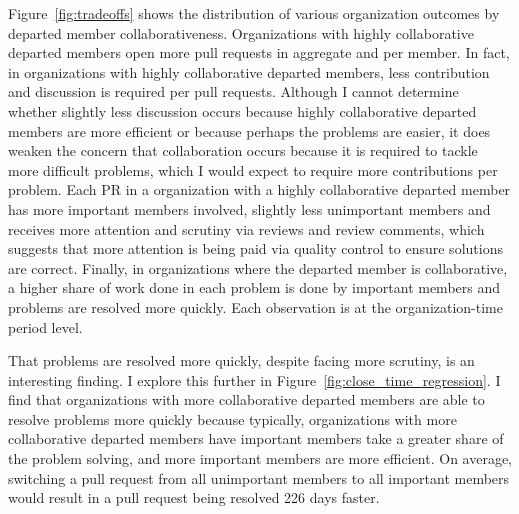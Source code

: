 \documentclass[12pt,notitlepage]{article}
\begin{document}
Figure~\ref{fig:tradeoffs} shows the distribution of various organization outcomes by departed member collaborativeness. Organizations with highly collaborative departed members open more pull requests in aggregate and per member. In fact, in organizations with highly collaborative departed members, less contribution and discussion is required per pull requests. Although I cannot determine whether slightly less discussion occurs because highly collaborative departed members are more efficient or because perhaps the problems are easier, it does weaken the concern that collaboration occurs because it is required to tackle more difficult problems, which I would expect to require more contributions per problem. Each PR in a organization with a highly collaborative departed member has more important members involved, slightly less unimportant members and receives more attention and scrutiny via reviews and review comments, which suggests that more attention is being paid via quality control to ensure solutions are correct. Finally, in organizations where the departed member is collaborative, a higher share of work done in each problem is done by important members and problems are resolved more quickly. Each observation is at the organization-time period level. 

That problems are resolved more quickly, despite facing more scrutiny, is an interesting finding. I explore this further in Figure~\ref{fig:close_time_regression}. I find that organizations with more collaborative departed members are able to resolve problems more quickly because typically, organizations with more collaborative departed members have important members take a greater share of the problem solving, and more important members are more efficient. On average, switching a pull request from all unimportant members to all important members would result in a pull request being resolved 226 days faster. 




\newpage
{}
\printbibliography[title={References}]














\end{document}
